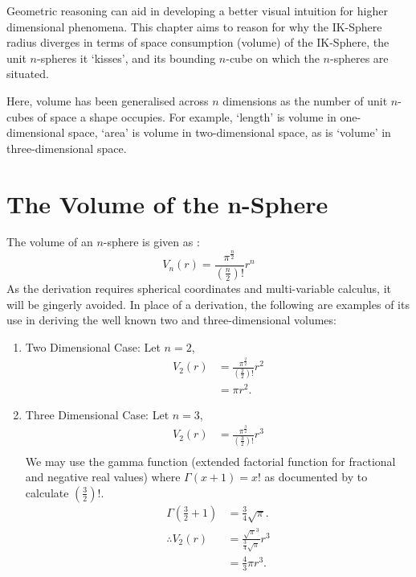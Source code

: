 Geometric reasoning can aid in developing a better visual intuition for higher dimensional phenomena. This chapter aims to reason for why the IK-Sphere radius diverges in terms of space consumption (volume) of the IK-Sphere, the unit $n$-spheres it `kisses', and its bounding $n$-cube on which the $n$-spheres are situated.

\begin{definition}[Volume]
    Here, volume has been generalised across $n$ dimensions as the number of unit $n$-cubes of space a shape occupies. For example, `length' is volume in one-dimensional space, `area' is volume in two-dimensional space, as is `volume' in three-dimensional space. 
\end{definition}

\section{The Volume of the n-Sphere}
The volume of an $n$-sphere is given as \cite{formula_n_sphere}:
\begin{equation}\label{eq:vol of sphere}
    V_n(r)=\frac{\pi^{\frac{n}{2}}}{\left(\frac{n}{2}\right)!}r^n
\end{equation}
As the derivation requires spherical coordinates and multi-variable calculus, it will be gingerly avoided. In place of a derivation, the following are examples of its use in deriving the well known two and three-dimensional volumes:
\begin{enumerate}
    \item Two Dimensional Case:
    Let $n=2$,
    \begin{align*}
        V_2(r)&=\frac{\pi^{\frac{2}{2}}}{\left(\frac{2}{2}\right)!}r^2\\
        &=\pi r^2.
    \end{align*}
    \item Three Dimensional Case:
    Let $n=3$,
    \begin{align*}
        V_2(r)&=\frac{\pi^{\frac{3}{2}}}{\left(\frac{3}{2}\right)!}r^3\\
    \end{align*}
    We may use the gamma function (extended factorial function for fractional and negative real values) where $\Gamma(x+1)=x!$ as documented by \cite{gronau2003gamma} to calculate $\left(\frac{3}{2}\right)!$.
    \begin{align*}
        \Gamma\left(\frac{3}{2}+1\right)&=\frac{3}{4}\sqrt{\pi}.\\
        \therefore V_2(r)&=\frac{\sqrt{\pi}^3}{\frac{3}{4}\sqrt{\pi}}r^3\\
        &=\frac{4}{3}\pi r^3.
    \end{align*}
\end{enumerate}

